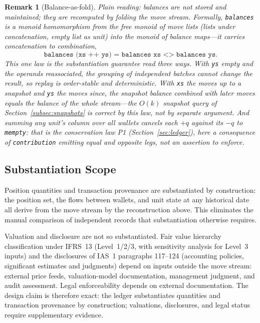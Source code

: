 \documentclass[11pt,a4paper]{article}
\newtheorem{remark}[definition]{Remark}
\begin{document}
\begin{remark}[Balance-as-fold]
Plain reading: balances are not stored and maintained; they are recomputed by folding the move stream. Formally, \lstinline!balances! is a \emph{monoid homomorphism} from the free monoid of move lists (lists under concatenation, empty list as unit) into the monoid of balance maps---it carries concatenation to combination,
\[
\texttt{balances (xs ++ ys) = balances xs <> balances ys}.
\]
This one law is the substantiation guarantee read three ways. With \texttt{ys} empty and the operands reassociated, the grouping of independent batches cannot change the result, so replay is order-stable and deterministic. With \texttt{xs} the moves up to a snapshot and \texttt{ys} the moves since, the snapshot balance combined with later moves equals the balance of the whole stream---the $O(k)$ snapshot query of Section~\ref{subsec:snapshots} is correct \emph{by this law}, not by separate argument. And summing any unit's column over all wallets cancels each $+q$ against its $-q$ to \texttt{mempty}: that is the conservation law P1 (Section~\ref{sec:ledger}), here a consequence of \lstinline!contribution! emitting equal and opposite legs, not an assertion to enforce.
\end{remark}

\subsection{Substantiation Scope}

Position quantities and transaction provenance are substantiated by construction: the position set, the flows between wallets, and unit state at any historical date all derive from the move stream by the reconstruction above. This eliminates the manual comparison of independent records that substantiation otherwise requires.

Valuation and disclosure are not so substantiated. Fair value hierarchy classification under IFRS~13 (Level~1/2/3, with sensitivity analysis for Level~3 inputs) and the disclosures of IAS~1 paragraphs 117--124 (accounting policies, significant estimates and judgments) depend on inputs outside the move stream: external price feeds, valuation-model documentation, management judgment, and audit assessment. Legal enforceability depends on external documentation. The design claim is therefore exact: the ledger substantiates quantities and transaction provenance by construction; valuations, disclosures, and legal status require supplementary evidence.
\end{document}
